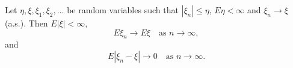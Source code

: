 Let $\eta, \xi, \xi_1, \xi_2, \ldots$ be random variables such that $|\xi_n| \leq \eta$, $E\eta < \infty$ and $\xi_n \to \xi$ (a.s.). Then $E|\xi| < \infty$,
$$E\xi_n \to E\xi \quad \text{as } n \to \infty,$$
and
$$E|\xi_n - \xi| \to 0 \quad \text{as } n \to \infty.$$
